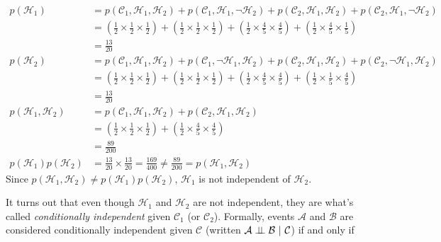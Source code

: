 \documentclass[assignment02_Solutions]{subfiles}
\begin{document}
\begin{exercise}[(20 minutes)]
\begin{boxedsolution}
\begin{align}
p(\mathcal{H}_1) &= p(\mathcal{C}_1, \mathcal{H}_1, \mathcal{H}_2) +  p(\mathcal{C}_1, \mathcal{H}_1, \neg \mathcal{H}_2)+  p(\mathcal{C}_2, \mathcal{H}_1, \mathcal{H}_2) +  p(\mathcal{C}_2, \mathcal{H}_1, \neg \mathcal{H}_2) \nonumber \\
&= \left ( \frac{1}{2} \times \frac{1}{2} \times \frac{1}{2}  \right) + \left ( \frac{1}{2} \times \frac{1}{2} \times \frac{1}{2} \right ) + \left ( \frac{1}{2} \times \frac{4}{5} \times \frac{4}{5}  \right) + \left ( \frac{1}{2} \times \frac{4}{5} \times \frac{1}{5} \right )\nonumber \\
&= \frac{13}{20} \nonumber \\
p(\mathcal{H}_2) &= p(\mathcal{C}_1, \mathcal{H}_1, \mathcal{H}_2) +  p(\mathcal{C}_1, \neg \mathcal{H}_1, \mathcal{H}_2)+  p(\mathcal{C}_2, \mathcal{H}_1, \mathcal{H}_2) +  p(\mathcal{C}_2, \neg \mathcal{H}_1, \mathcal{H}_2) \nonumber \\
&= \left ( \frac{1}{2} \times \frac{1}{2} \times \frac{1}{2}  \right) + \left ( \frac{1}{2} \times \frac{1}{2} \times \frac{1}{2} \right ) + \left ( \frac{1}{2} \times \frac{4}{5} \times \frac{4}{5}  \right) + \left ( \frac{1}{2} \times \frac{1}{5} \times \frac{4}{5} \right )\nonumber \\
&= \frac{13}{20} \nonumber \\
p(\mathcal{H}_1, \mathcal{H}_2) &=  p(\mathcal{C}_1, \mathcal{H}_1, \mathcal{H}_2) + p(\mathcal{C}_2, \mathcal{H}_1, \mathcal{H}_2) \nonumber \\
&= \left ( \frac{1}{2} \times \frac{1}{2} \times \frac{1}{2} \right ) + \left ( \frac{1}{2} \times \frac{4}{5} \times \frac{4}{5} \right ) \nonumber \\
&= \frac{89}{200} \nonumber \\
p(\mathcal{H}_1) p(\mathcal{H}_2) &= \frac{13}{20} \times \frac{13}{20} = \frac{169}{400} \neq \frac{89}{200} = p(\mathcal{H}_1, \mathcal{H}_2) \nonumber
\end{align}
Since $p(\mathcal{H}_1, \mathcal{H}_2) \neq p(\mathcal{H}_1) p(\mathcal{H}_2)$, $\mathcal{H}_1$ is not independent of $\mathcal{H}_2$.

\end{boxedsolution}
\end{exercise}

It turns out that even though $\mathcal{H}_1$ and $\mathcal{H}_2$ are not independent, they are what's called \emph{conditionally independent} given $\mathcal{C}_1$ (or $\mathcal{C}_2$).  Formally, events $\mathcal{A}$ and $\mathcal{B}$ are considered conditionally independent given $\mathcal{C}$ (written $\mathcal{A} \perp\!\!\!\perp \mathcal{B}~|~\mathcal{C}$) if and only if
\end{document}
